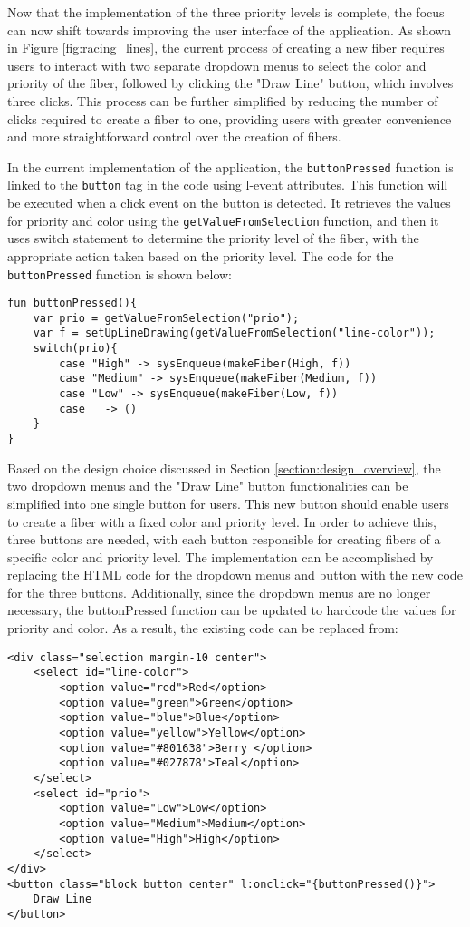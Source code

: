 \documentclass[logo,bsc,singlespacing,parskip]{infthesis}
\begin{document}
Now that the implementation of the three priority levels is complete, the focus can now shift towards improving the user interface of the application. As shown in Figure \ref{fig:racing_lines}, the current process of creating a new fiber requires users to interact with two separate dropdown menus to select the color and priority of the fiber, followed by clicking the "Draw Line" button, which involves three clicks. This process can be further simplified by reducing the number of clicks required to create a fiber to one, providing users with greater convenience and more straightforward control over the creation of fibers.

In the current implementation of the application, the \texttt{buttonPressed} function is linked to the \texttt{button} tag in the code using l-event attributes. This function will be executed when a click event on the button is detected. It retrieves the values for priority and color using the \texttt{getValueFromSelection} function, and then it uses switch statement to determine the priority level of the fiber, with the appropriate action taken based on the priority level. The code for the \texttt{buttonPressed} function is shown below:

\begin{verbatim}
fun buttonPressed(){
    var prio = getValueFromSelection("prio");
    var f = setUpLineDrawing(getValueFromSelection("line-color"));
    switch(prio){
        case "High" -> sysEnqueue(makeFiber(High, f))
        case "Medium" -> sysEnqueue(makeFiber(Medium, f))
        case "Low" -> sysEnqueue(makeFiber(Low, f))
        case _ -> ()
    }
}
\end{verbatim}

Based on the design choice discussed in Section \ref{section:design_overview}, the two dropdown menus and the "Draw Line" button functionalities can be simplified into one single button for users. This new button should enable users to create a fiber with a fixed color and priority level. In order to achieve this, three buttons are needed, with each button responsible for creating fibers of a specific color and priority level. The implementation can be accomplished by replacing the HTML code for the dropdown menus and button with the new code for the three buttons. Additionally, since the dropdown menus are no longer necessary, the buttonPressed function can be updated to hardcode the values for priority and color. As a result, the existing code can be replaced from:
\begin{verbatim}
<div class="selection margin-10 center">
    <select id="line-color">
        <option value="red">Red</option>
        <option value="green">Green</option>
        <option value="blue">Blue</option>
        <option value="yellow">Yellow</option>
        <option value="#801638">Berry </option>
        <option value="#027878">Teal</option>
    </select>
    <select id="prio">
        <option value="Low">Low</option>
        <option value="Medium">Medium</option>
        <option value="High">High</option>
    </select>
</div>
<button class="block button center" l:onclick="{buttonPressed()}">
    Draw Line
</button>
\end{verbatim}
\end{document}
